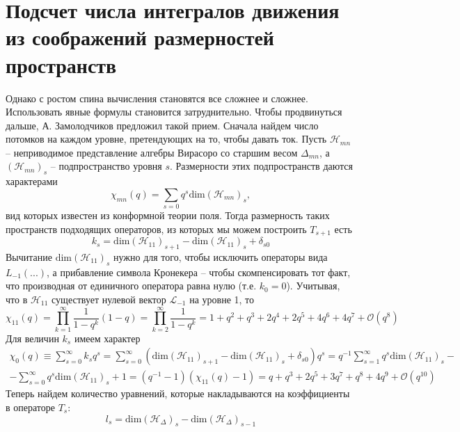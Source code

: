 \documentclass[12pt]{article}
\theoremstyle{definition}
\begin{document}
\section{Подсчет числа интегралов движения из соображений размерностей пространств}
Однако с ростом спина вычисления становятся все сложнее и сложнее. Использовать явные формулы становится затруднительно. Чтобы продвинуться дальше, А. Замолодчиков предложил такой прием. Сначала найдем число потомков на каждом уровне, претендующих на то, чтобы давать ток. Пусть $\mathcal{H}_{mn}$ -- неприводимое представление алгебры Вирасоро со старшим весом $\Delta_{mn}$, а $(\mathcal{H}_{mn})_s$ -- подпространство уровня $s$. Размерности этих подпространств даются характерами
\begin{equation}
    \chi_{mn}(q)=\sum\limits_{s=0}q^s\text{dim}(\mathcal{H}_{mn})_s,
\end{equation}
вид которых известен из конформной теории поля. Тогда размерность таких пространств подходящих операторов, из которых мы можем построить $T_{s+1}$ есть
\begin{equation}
    k_s=\text{dim}(\mathcal{H}_{11})_{s+1}-\text{dim}(\mathcal{H}_{11})_s+\delta_{s0}
\end{equation}
Вычитание $\text{dim}(\mathcal{H}_{11})_s$ нужно для того, чтобы исключить операторы вида $L_{-1}(...)$, а прибавление символа Кронекера -- чтобы скомпенсировать тот факт, что производная от единичного оператора равна нулю (т.е. $k_0=0$). Учитывая, что в $\mathcal{H}_{11}$ существует нулевой вектор $\mathcal{L}_{-1}$ на уровне 1, то
\begin{equation}
    \chi_{11}(q)=\prod\limits_{k=1}^\infty\frac{1}{1-q^k}(1-q)=\prod\limits_{k=2}^\infty\frac{1}{1-q^k}=1+q^2+q^3+2q^4+2q^5+4q^6+4q^7+\mathcal{O}(q^8)
\end{equation}
Для величин $k_s$ имеем характер
\begin{multline}
    \chi_0(q)\equiv\sum\limits_{s=0}^\infty k_sq^s=\sum\limits_{s=0}^\infty(\text{dim}(\mathcal{H}_{11})_{s+1}-\text{dim}(\mathcal{H}_{11})_s+\delta_{s0})q^s=q^{-1}\sum\limits_{s=1}^\infty q^s\text{dim}(\mathcal{H}_{11})_s-\\-\sum\limits_{s=0}^\infty q^s\text{dim}(\mathcal{H}_{11})_s+1=(q^{-1}-1)(\chi_{11}(q)-1)=q+q^3+2q^5+3q^7+q^8+4q^9+\mathcal{O}(q^{10})
\end{multline}
Теперь найдем количество уравнений, которые накладываются на коэффициенты в операторе $T_s$:
\begin{equation}
    l_s=\text{dim}(\mathcal{H}_\Delta)_s-\text{dim}(\mathcal{H}_\Delta)_{s-1}
\end{equation}
\end{document}
